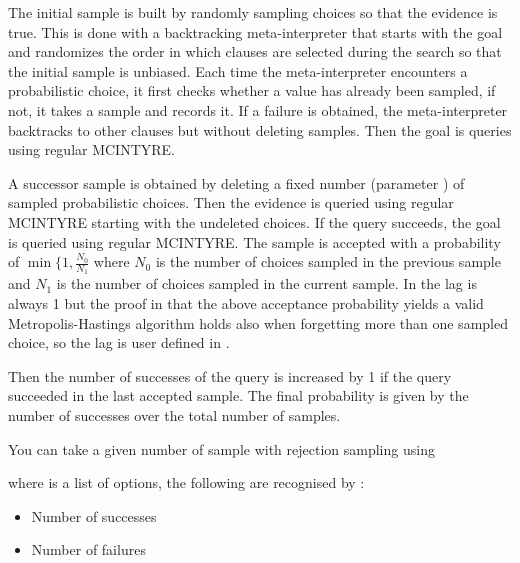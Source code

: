 \documentclass[letterpaper,10pt,english]{sphinxmanual}
\begin{document}
The initial sample is built by randomly sampling choices so that the evidence is true.
This is done with a backtracking meta-interpreter that starts with the goal and randomizes the order in which clauses are selected during the search so that the initial sample is unbiased.
Each time the meta-interpreter encounters a probabilistic choice, it first checks whether a value has already been sampled, if not, it takes a sample and records it.
If a failure is obtained, the meta-interpreter backtracks to other clauses but without deleting samples. Then the goal is queries using regular MCINTYRE.

A successor sample is obtained by deleting a fixed number (parameter ) of sampled probabilistic choices.
Then the evidence is queried using regular MCINTYRE starting with the undeleted choices.
If the query succeeds, the goal is queried using regular MCINTYRE.
The sample is accepted with a probability of \(\min\{1,\frac{N_0}{N_1}\) where \(N_0\) is the number of choices sampled in the previous sample and \(N_1\) is the number of choices sampled in the current sample.
In  the lag is always 1 but the proof in  that the above acceptance probability yields a valid Metropolis-Hastings algorithm holds also when forgetting more than one sampled choice, so the lag is user defined in .

Then the number of successes of the query is increased by 1 if the query succeeded in the last accepted sample.
The final probability is given by the number of successes over the total number of samples.

You can take a given number of sample with rejection sampling using

\begin{sphinxVerbatim}[commandchars=\\\{\}]
  
\end{sphinxVerbatim}

where  is a list of options, the following are recognised by :
\begin{itemize}
\item {} 
 Number of successes

\item {} 
 Number of failures

\end{itemize}
\end{document}
